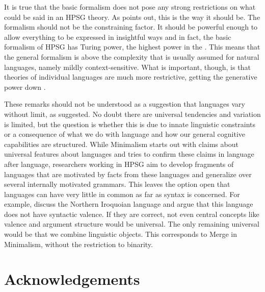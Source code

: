 \documentclass[output=paper
                ,modfonts
                ,nonflat
	        ,collection
	        ,collectionchapter
	        ,collectiontoclongg
 	        ,biblatex
                ,babelshorthands
                ,newtxmath
                ,draftmode
                ,colorlinks, citecolor=brown
]{./langsci/langscibook}
\begin{document}
It is true that
the basic formalism does not pose any strong restrictions on what could be said in an HPSG
theory. As \citet{Pollard96a} points out, this is the way it should be. The formalism should not be
the constraining factor. It should be powerful enough to allow everything to be expressed in
insightful ways and in fact, the basic formalism of HPSG has Turing power, the highest power in the
 \citep{Pollard99a}. This means that the general formalism is above the complexity that is usually
assumed for natural languages, namely mildly context-sensitive. What is important, though, is that theories of individual languages are much more
restrictive, getting the generative power down \citep[Chapter~17]{MuellerGT-Eng1}. 

These remarks should not be understood as a suggestion that languages vary without limit, as
\citet[]{Joos58a} suggested. No doubt there are universal tendencies and variation
is limited, but the question is whether this is due to innate linguistic constraints or a
consequence of what we do with language and how our general cognitive capabilities are structured. 
While Minimalism starts out with claims about universal features about languages and tries to
confirm these claims in language after language, researchers working in HPSG aim to develop
fragments of languages that are motivated by facts from these languages and generalize over several
internally motivated grammars. This leaves the option open that languages can have very little in
common as far as syntax is concerned. For example, \citet{KM2012a} discuss the Northern Iroquoian language  and argue that this language
does not have syntactic valence. If they are correct, not even central concepts like valence and
argument structure would be universal. The only remaining universal would be that we combine
linguistic objects. This corresponds to Merge in Minimalism, without the restriction to binarity.



\section*{Acknowledgements}
\end{document}
